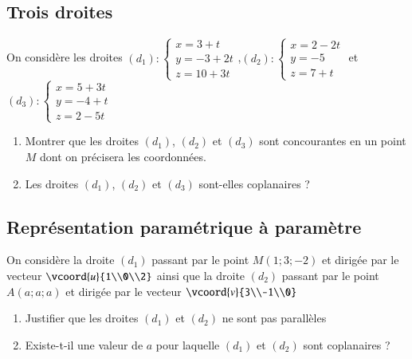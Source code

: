 \documentclass[oneside,12pt]{article}          %
\begin{document}
\subsection{Trois droites}
On considère les droites $(d_1):\begin{cases}x=3+t\\y=-3+2t\\z=10+3t\end{cases}$,\quad$(d_2):\begin{cases}x=2-2t\\y=-5\\z=7+t\end{cases}$ et $(d_3):\begin{cases}x=5+3t\\y=-4+t\\z=2-5t\end{cases}$
\begin{enumerate}
	\item Montrer que les droites $(d_1)$, $(d_2)$ et $(d_3)$ sont concourantes en un point $M$ dont on précisera les coordonnées.
	\item Les droites $(d_1)$, $(d_2)$ et $(d_3)$ sont-elles coplanaires ?
\end{enumerate}



\subsection{Représentation paramétrique à paramètre}
On considère la droite $(d_1)$ passant par le point $M(1;3;-2)$ et dirigée par le vecteur $\vcoord{u}{1\\0\\2}$ ainsi que la droite $(d_2)$ passant par le point $A(a;a;a)$ et dirigée par le vecteur $\vcoord{v}{3\\-1\\0}$
\begin{enumerate}
	\item Justifier que les droites $(d_1)$ et $(d_2)$ ne sont pas parallèles
    \item Existe-t-il une valeur de $a$ pour laquelle $(d_1)$ et $(d_2)$ sont coplanaires ?
\end{enumerate}
\end{document}

